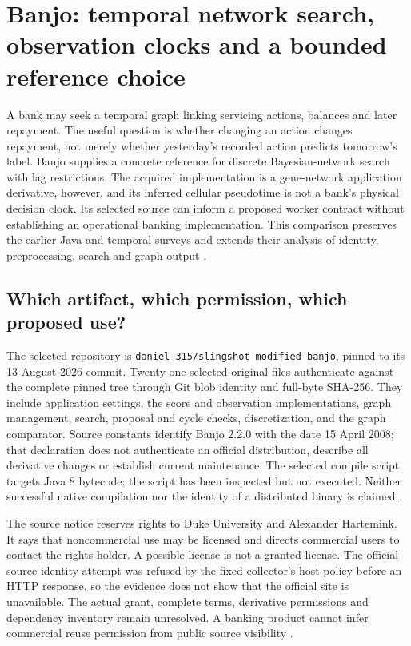 \section{Banjo: temporal network search, observation clocks and a bounded reference choice}
\label{sec:exec24-banjo-reuse}

A bank may seek a temporal graph linking servicing actions, balances and later
repayment. The useful question is whether changing an action changes repayment,
not merely whether yesterday's recorded action predicts tomorrow's label.
Banjo supplies a concrete reference for discrete Bayesian-network search with
lag restrictions. The acquired implementation is a gene-network application
derivative, however, and its inferred cellular pseudotime is not a bank's
physical decision clock. Its selected source can inform a proposed worker
contract without establishing an operational banking implementation.
This comparison preserves the earlier Java and temporal surveys and extends
their analysis of identity, preprocessing, search and graph output
\citep{exec13_java_banjo,exec15_javatemporal_banjo,exec24_banjo_source}.

\subsection{Which artifact, which permission, which proposed use?}
The selected repository is \texttt{daniel-315/slingshot-modified-banjo}, pinned
to its 13 August 2026 commit. Twenty-one selected original files authenticate
against the complete pinned tree through Git blob identity and full-byte
SHA-256. They include application settings, the score and observation
implementations, graph management, search, proposal and cycle checks,
discretization, and the graph comparator. Source constants identify Banjo
2.2.0 with the date 15 April 2008; that declaration does not authenticate an
official distribution, describe all derivative changes or establish current
maintenance. The selected compile script targets Java 8 bytecode; the script
has been inspected but not executed. Neither successful native compilation nor
the identity of a distributed binary is claimed \citep{exec24_banjo_source}.

The source notice reserves rights to Duke University and Alexander Hartemink.
It says that noncommercial use may be licensed and directs commercial users
to contact the rights holder. A possible license is not a granted license.
The official-source identity attempt was refused by the fixed collector's
host policy before an HTTP response, so the evidence does not show that the
official site is unavailable. The actual grant, complete terms, derivative
permissions and dependency inventory remain unresolved. A banking product
cannot infer commercial reuse permission from public source visibility
\citep{exec24_banjo_source,exec24_banjo_choice}.

